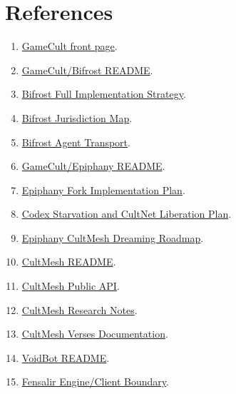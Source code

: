 \documentclass[11pt,oneside]{report}
\begin{document}
\chapter{References}

\begin{enumerate}[leftmargin=1.8em]
  \item \href{https://gamecult.org/}{GameCult front page}.
  \item \href{https://github.com/GameCult/Bifrost/blob/main/README.md}{GameCult/Bifrost README}.
  \item \href{https://github.com/GameCult/Bifrost/blob/main/docs/full-implementation-strategy.md}{Bifrost Full Implementation Strategy}.
  \item \href{https://github.com/GameCult/Bifrost/blob/main/docs/jurisdiction-map.md}{Bifrost Jurisdiction Map}.
  \item \href{https://github.com/GameCult/Bifrost/blob/main/docs/agent-transport.md}{Bifrost Agent Transport}.
  \item \href{https://github.com/GameCult/Epiphany/blob/main/README.md}{GameCult/Epiphany README}.
  \item \href{https://github.com/GameCult/Epiphany/blob/main/notes/epiphany-fork-implementation-plan.md}{Epiphany Fork Implementation Plan}.
  \item \href{https://github.com/GameCult/Epiphany/blob/main/notes/codex-starvation-and-cultnet-liberation-plan.md}{Codex Starvation and CultNet Liberation Plan}.
  \item \href{https://github.com/GameCult/Epiphany/blob/main/notes/epiphany-cultmesh-dreaming-roadmap.md}{Epiphany CultMesh Dreaming Roadmap}.
  \item \href{https://github.com/GameCult/CultLib/blob/main/src/GameCult.Mesh/README.md}{CultMesh README}.
  \item \href{https://github.com/GameCult/CultLib/blob/main/src/GameCult.Mesh/docs/public-api.md}{CultMesh Public API}.
  \item \href{https://github.com/GameCult/CultLib/blob/main/src/GameCult.Mesh/docs/research.md}{CultMesh Research Notes}.
  \item \href{https://github.com/GameCult/CultLib/blob/main/src/GameCult.Mesh/docs/verses.md}{CultMesh Verses Documentation}.
  \item \href{https://github.com/GameCult/VoidBot/blob/main/README.md}{VoidBot README}.
  \item \href{https://github.com/GameCult/Fensalir/blob/main/docs/engine-client-boundary.md}{Fensalir Engine/Client Boundary}.

\end{enumerate}
\end{document}
